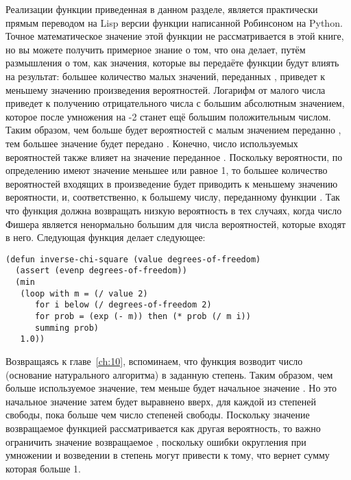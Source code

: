 Реализации функции  приведенная в данном разделе, является
практически прямым переводом на Lisp версии функции написанной Робинсоном на Python.
Точное математическое значение этой функции не рассматривается в этой книге, но вы можете
получить примерное знание о том, что она делает, путём размышления о том, как значения,
которые вы передаёте функции  будут влиять на результат: большее количество
малых значений, переданных , приведет к меньшему значению произведения
вероятностей.  Логарифм от малого числа приведет к получению отрицательного числа с
большим абсолютным значением, которое после умножения на -2 станет ещё большим
положительным числом.  Таким образом, чем больше будет вероятностей с малым значением
переданно , тем большее значение будет передано
. Конечно, число используемых вероятностей также влияет на
значение переданное .  Поскольку вероятности, по определению
имеют значение меньшее или равное 1, то большее количество вероятностей входящих в
произведение будет приводить к меньшему значению вероятности, и, соответственно, к
большему числу, переданному функции .  Так что функция
 должна возвращать низкую вероятность в тех случаях, когда число
Фишера является ненормально большим для числа вероятностей, которые входят в него.
Следующая функция делает следующее:

\begin{lstlisting}
(defun inverse-chi-square (value degrees-of-freedom)
  (assert (evenp degrees-of-freedom))
  (min 
   (loop with m = (/ value 2)
      for i below (/ degrees-of-freedom 2)
      for prob = (exp (- m)) then (* prob (/ m i))
      summing prob)
   1.0))
\end{lstlisting}

Возвращаясь к главе~\ref{ch:10}, вспоминаем, что функция  возводит число
 (основание натурального алгоритма) в заданную степень.  Таким образом, чем больше
используемое значение, тем меньше будет начальное значение .  Но это начальное
значение затем будет выравнено вверх, для каждой из степеней свободы, пока  больше
чем число степеней свободы.  Поскольку значение возвращаемое функцией
 рассматривается как другая вероятность, то важно ограничить
значение возвращаемое , поскольку ошибки округления при умножении и возведении в
степень могут привести к тому, что  вернет сумму которая больше 1.

